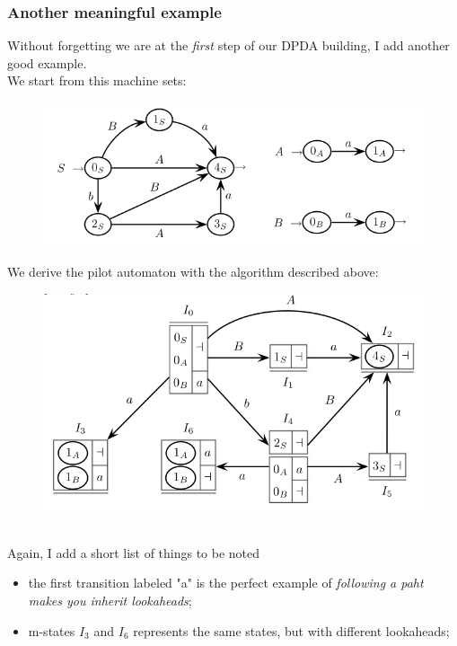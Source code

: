 \documentclass[10pt,a4paper]{article}
\begin{document}
				\subsubsection{Another meaningful example}
					Without forgetting we are at the \emph{first} step of our DPDA building, I add another good example.\\
					We start from this machine sets:
					\begin{figure}[H]
						\begin{center}
							\includegraphics[width = \textwidth]{./images/ex2.png}
						\end{center}
					\end{figure}
					We derive the pilot automaton with the algorithm described above:
					\begin{figure}[H]
						\begin{center}
							\includegraphics[width = \textwidth]{./images/ex2Pilot.png}
						\end{center}
					\end{figure}\\
					Again, I add a short list of things to be noted
					\begin{itemize}
						\item the first transition labeled "a" is the perfect example of \emph{following a paht makes you inherit lookaheads};
						\item m-states $I_3$ and $I_6$ represents the same states, but with different lookaheads;
					\end{itemize}
					
\end{document}
